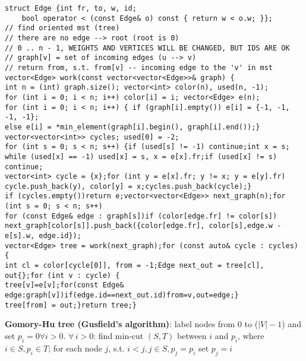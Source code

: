 \documentclass[12pt]{article}
\begin{document}
\begin{verbatim}
struct Edge {int fr, to, w, id;
    bool operator < (const Edge& o) const { return w < o.w; }};
// find oriented mst (tree)
// there are no edge --> root (root is 0)
// 0 .. n - 1, WEIGHTS AND VERTICES WILL BE CHANGED, BUT IDS ARE OK
// graph[v] = set of incoming edges (u --> v)
// return from, s.t. from[v] -- incoming edge to the 'v' in mst
vector<Edge> work(const vector<vector<Edge>>& graph) {
int n = (int) graph.size(); vector<int> color(n), used(n, -1);
for (int i = 0; i < n; i++) color[i] = i; vector<Edge> e(n);
for (int i = 0; i < n; i++) { if (graph[i].empty()) e[i] = {-1, -1, -1, -1};
else e[i] = *min_element(graph[i].begin(), graph[i].end());}
vector<vector<int>> cycles; used[0] = -2;
for (int s = 0; s < n; s++) {if (used[s] != -1) continue;int x = s; 
while (used[x] == -1) used[x] = s, x = e[x].fr;if (used[x] != s) continue; 
vector<int> cycle = {x};for (int y = e[x].fr; y != x; y = e[y].fr) 
cycle.push_back(y), color[y] = x;cycles.push_back(cycle);}
if (cycles.empty())return e;vector<vector<Edge>> next_graph(n);for (int s = 0; s < n; s++)
for (const Edge& edge : graph[s])if (color[edge.fr] != color[s])
next_graph[color[s]].push_back({color[edge.fr], color[s],edge.w - e[s].w, edge.id});
vector<Edge> tree = work(next_graph);for (const auto& cycle : cycles) {
int cl = color[cycle[0]], from = -1;Edge next_out = tree[cl], out{};for (int v : cycle) {
tree[v]=e[v];for(const Edge& edge:graph[v])if(edge.id==next_out.id)from=v,out=edge;}
tree[from] = out;}return tree;}
\end{verbatim}

{\bf Gomory-Hu tree (Gusfield’s algorithm)}: label nodes from $0$ to ($|V| - 1$) and 
set $p_i=0 \forall i > 0$. $\forall\,i > 0$: find min-cut $(S, T)$ 
between $i$ and $p_i$, where $i \in S, p_i \in T$; 
for each node $j$, s.t. $i < j, j \in S, p_j=p_i$ set $p_j = i$
\end{document}
